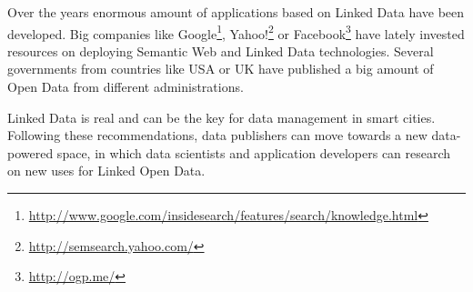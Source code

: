 Over the years enormous amount of applications based on Linked Data have been developed. Big companies like Google\footnote{\url{http://www.google.com/insidesearch/features/search/knowledge.html}}, Yahoo!\footnote{\url{http://semsearch.yahoo.com/}} or Facebook\footnote{\url{http://ogp.me/}} have lately invested resources on deploying Semantic Web and Linked Data technologies. Several governments from countries like USA or UK have published a big amount of Open Data from different administrations. 

Linked Data is real and can be the key for data management in smart cities. Following these recommendations, data publishers can move towards a new data-powered space, in which data scientists and application developers can research on new uses for Linked Open Data.